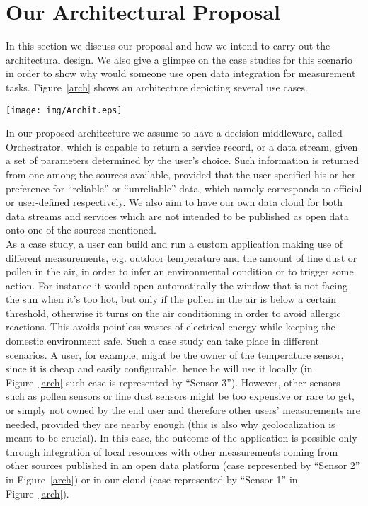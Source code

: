 \section{Our Architectural Proposal}
\label{sec:casestudy}
In this section we discuss our proposal and how we intend to carry out the architectural design.
We also give a glimpse on the case studies for this scenario in order to show why would someone use open data integration for measurement tasks. Figure~\ref{arch} shows an architecture depicting several use cases.

\begin{figure*}[!t]
\centering
\texttt{[image: img/Archit.eps]} 
\caption{Our proposed architecture.}
\label{arch}
\end{figure*}

In our proposed architecture we assume to have a decision middleware, called Orchestrator, which is capable to return a service record, or a data stream, given a set of parameters determined by the user's choice.
Such information is returned from one among the sources available, provided that the user specified his or her preference for ``reliable'' or ``unreliable'' data, which namely corresponds to official or user-defined respectively.
We also aim to have our own data cloud for both data streams and services which are not intended to be published as open data onto one of the sources mentioned.
\\

As a case study, a user can build and run a custom application making use of different measurements, e.g. outdoor temperature and the amount of fine dust or pollen in the air, in order to infer an environmental condition or to trigger some action.
For instance it would open automatically the window that is not facing the sun when it's too hot, but only if the pollen in the air is below a certain threshold, otherwise it turns on the air conditioning in order to avoid allergic reactions.
This avoids pointless wastes of electrical energy while keeping the domestic environment safe.
Such a case study can take place in different scenarios.
A user, for example, might be the owner of the temperature sensor, since it is cheap and easily configurable, hence he will use it locally (in Figure~\ref{arch} such case is represented by ``Sensor 3'').
However, other sensors such as pollen sensors or fine dust sensors might be too expensive or rare to get, or simply not owned by the end user and therefore other users' measurements are needed, provided they are nearby enough (this is also why geolocalization is meant to be crucial).
In this case, the outcome of the application is possible only through integration of local resources with other measurements coming from other sources published in an open data platform (case represented by ``Sensor 2'' in Figure~\ref{arch}) or in our cloud (case represented by ``Sensor 1'' in Figure~\ref{arch}).
\\

